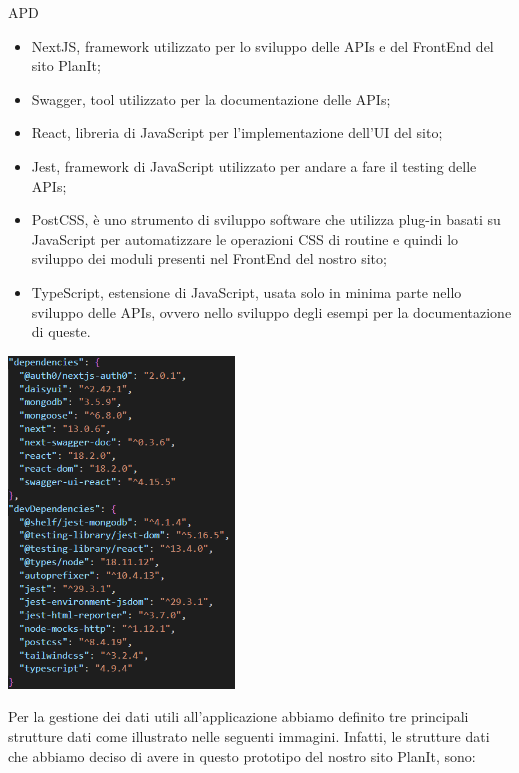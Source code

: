 \begin{listaPersonale} {APD}
\begin{itemize}
        \item NextJS, framework utilizzato per lo sviluppo delle APIs e del FrontEnd del sito PlanIt;
        \item Swagger, tool utilizzato per la documentazione delle APIs;
        \item React, libreria di JavaScript per l'implementazione dell'UI del sito;
        \item Jest, framework di JavaScript utilizzato per andare a fare il testing delle APIs;
        \item PostCSS, è uno strumento di sviluppo software che utilizza plug-in basati su JavaScript per automatizzare le operazioni CSS di routine e quindi lo sviluppo dei moduli presenti nel FrontEnd del nostro sito;
        \item TypeScript, estensione di JavaScript, usata solo in minima parte nello sviluppo delle APIs, ovvero nello sviluppo degli esempi per la documentazione di queste.
    \end{itemize}
    \begin{center}
        \includegraphics[width=0.45\textwidth, height=0.4\textheight]{img/png/package_json.png}
    \end{center}
    \newpage
    Per la gestione dei dati utili all'applicazione abbiamo definito tre principali strutture dati come illustrato nelle seguenti immagini. Infatti, le strutture dati che abbiamo deciso di avere in questo prototipo del nostro sito PlanIt, sono:
    \begin{itemize}

\end{itemize}
\end{listaPersonale}

